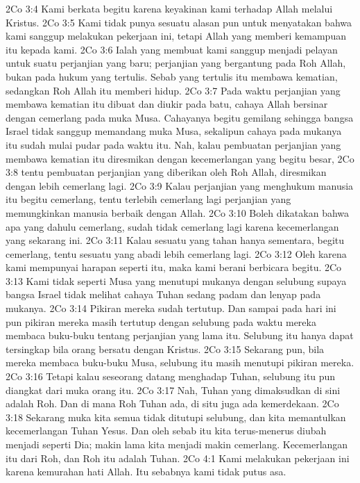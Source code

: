 2Co 3:4  Kami berkata begitu karena keyakinan kami terhadap Allah melalui Kristus.
2Co 3:5  Kami tidak punya sesuatu alasan pun untuk menyatakan bahwa kami sanggup melakukan pekerjaan ini, tetapi Allah yang memberi kemampuan itu kepada kami.
2Co 3:6  Ialah yang membuat kami sanggup menjadi pelayan untuk suatu perjanjian yang baru; perjanjian yang bergantung pada Roh Allah, bukan pada hukum yang tertulis. Sebab yang tertulis itu membawa kematian, sedangkan Roh Allah itu memberi hidup.
2Co 3:7  Pada waktu perjanjian yang membawa kematian itu dibuat dan diukir pada batu, cahaya Allah bersinar dengan cemerlang pada muka Musa. Cahayanya begitu gemilang sehingga bangsa Israel tidak sanggup memandang muka Musa, sekalipun cahaya pada mukanya itu sudah mulai pudar pada waktu itu. Nah, kalau pembuatan perjanjian yang membawa kematian itu diresmikan dengan kecemerlangan yang begitu besar,
2Co 3:8  tentu pembuatan perjanjian yang diberikan oleh Roh Allah, diresmikan dengan lebih cemerlang lagi.
2Co 3:9  Kalau perjanjian yang menghukum manusia itu begitu cemerlang, tentu terlebih cemerlang lagi perjanjian yang memungkinkan manusia berbaik dengan Allah.
2Co 3:10  Boleh dikatakan bahwa apa yang dahulu cemerlang, sudah tidak cemerlang lagi karena kecemerlangan yang sekarang ini.
2Co 3:11  Kalau sesuatu yang tahan hanya sementara, begitu cemerlang, tentu sesuatu yang abadi lebih cemerlang lagi.
2Co 3:12  Oleh karena kami mempunyai harapan seperti itu, maka kami berani berbicara begitu.
2Co 3:13  Kami tidak seperti Musa yang menutupi mukanya dengan selubung supaya bangsa Israel tidak melihat cahaya Tuhan sedang padam dan lenyap pada mukanya.
2Co 3:14  Pikiran mereka sudah tertutup. Dan sampai pada hari ini pun pikiran mereka masih tertutup dengan selubung pada waktu mereka membaca buku-buku tentang perjanjian yang lama itu. Selubung itu hanya dapat tersingkap bila orang bersatu dengan Kristus.
2Co 3:15  Sekarang pun, bila mereka membaca buku-buku Musa, selubung itu masih menutupi pikiran mereka.
2Co 3:16  Tetapi kalau seseorang datang menghadap Tuhan, selubung itu pun diangkat dari muka orang itu.
2Co 3:17  Nah, Tuhan yang dimaksudkan di sini adalah Roh. Dan di mana Roh Tuhan ada, di situ juga ada kemerdekaan.
2Co 3:18  Sekarang muka kita semua tidak ditutupi selubung, dan kita memantulkan kecemerlangan Tuhan Yesus. Dan oleh sebab itu kita terus-menerus diubah menjadi seperti Dia; makin lama kita menjadi makin cemerlang. Kecemerlangan itu dari Roh, dan Roh itu adalah Tuhan.
2Co 4:1  Kami melakukan pekerjaan ini karena kemurahan hati Allah. Itu sebabnya kami tidak putus asa.
